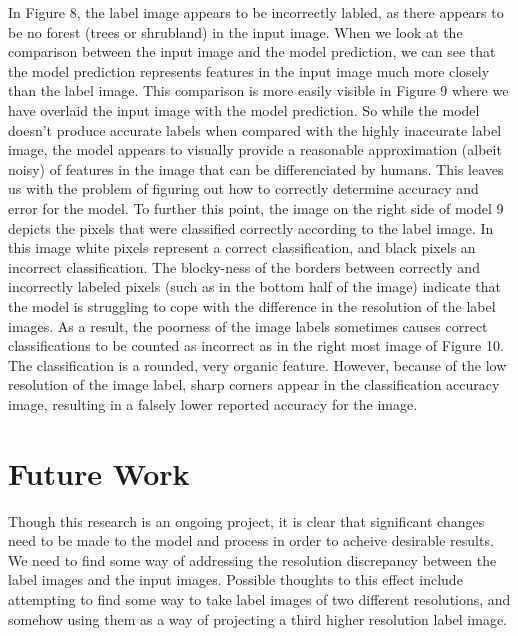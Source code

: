 \documentclass[12pt]{article}
\begin{document}
 In Figure 8, the label image appears to be incorrectly labled, as there appears to be no forest (trees or shrubland) in the input image. When we look at the comparison between the input image and the model prediction, we can see that the model prediction represents features in the input image much more closely than the label image. This comparison is more easily visible in Figure 9 where we have overlaid the input image with the model prediction. So while the model doesn't produce accurate labels when compared with the highly inaccurate label image, the model appears to visually provide a reasonable approximation (albeit noisy) of features in the image that can be differenciated by humans. This leaves us with the problem of figuring out how to correctly determine accuracy and error for the model. To further this point, the image on the right side of model 9 depicts the pixels that were classified correctly according to the label image. In this image white pixels represent a correct classification, and black pixels an incorrect classification. The blocky-ness of the borders between correctly and incorrectly labeled pixels (such as in the bottom half of the image) indicate that the model is struggling to cope with the difference in the resolution of the label images. As a result, the poorness of the image labels sometimes causes correct classifications to be counted as incorrect as in the right most image of Figure 10. The classification is a rounded, very organic feature. However, because of the low resolution of the image label, sharp corners appear in the classification accuracy image, resulting in a falsely lower reported accuracy for the image.

\begin{figure}[!htb]
\end{figure}


\section{Future Work}

Though this research is an ongoing project, it is clear that significant changes need to be made to the model and process in order to acheive desirable results. We need to find some way of addressing the resolution discrepancy between the label images and the input images. Possible thoughts to this effect include attempting to find some way to take label images of two different resolutions, and somehow using them as a way of projecting a third higher resolution label image. 
\end{document}
